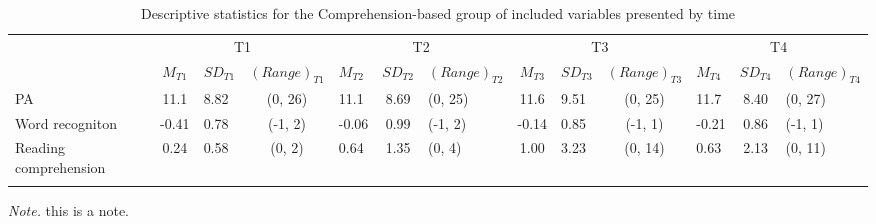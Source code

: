 \documentclass[
  ,
]{article}
\begin{document}
\begin{table}[tbp]

\begin{center}
\begin{threeparttable}

\caption{\label{tab:desc-read-animega-table}Descriptive statistics for the Comprehension-based group of included variables presented by time}

\small{

\begin{tabular}{lclclclclclcl}
\toprule
 & \multicolumn{3}{c}{T1} & \multicolumn{3}{c}{T2} & \multicolumn{3}{c}{T3} & \multicolumn{3}{c}{T4} \\
\cmidrule(r){2-4} \cmidrule(r){5-7} \cmidrule(r){8-10} \cmidrule(r){11-13}
  & $M_{T1}$ & $SD_{T1}$ & $(Range)_{T1}$ & $M_{T2}$ & $SD_{T2}$ & $(Range)_{T2}$ & $M_{T3}$ & $SD_{T3}$ & $(Range)_{T3}$ & $M_{T4}$ & $SD_{T4}$ & $(Range)_{T4}$\\
\midrule
PA & 11.1 & 8.82 & (0, 26) & 11.1 & 8.69 & (0, 25) & 11.6 & 9.51 & (0, 25) & 11.7 & 8.40 & (0, 27)\\
Word recogniton & -0.41 & 0.78 & (-1, 2) & -0.06 & 0.99 & (-1, 2) & -0.14 & 0.85 & (-1, 1) & -0.21 & 0.86 & (-1, 1)\\
Reading comprehension & 0.24 & 0.58 & (0, 2) & 0.64 & 1.35 & (0, 4) & 1.00 & 3.23 & (0, 14) & 0.63 & 2.13 & (0, 11)\\
\bottomrule
\addlinespace
\end{tabular}

}

\begin{tablenotes}[para]
\normalsize{\textit{Note.} this is a note.}
\end{tablenotes}

\end{threeparttable}
\end{center}

\end{table}
\end{document}
